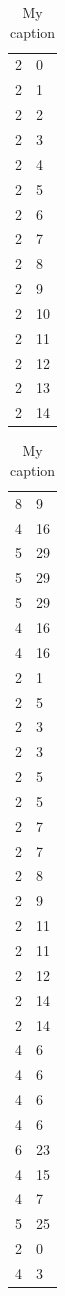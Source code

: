 \documentclass[14pt,letterpaper,hidelinks]{extarticle}
\begin{document}
\begin{table}[]
\centering
\caption{My caption}
\label{my-label}
\begin{tabular}{ll}
2 & 0  \\
2 & 1  \\
2 & 2  \\
2 & 3  \\
2 & 4  \\
2 & 5  \\
2 & 6  \\
2 & 7  \\
2 & 8  \\
2 & 9  \\
2 & 10 \\
2 & 11 \\
2 & 12 \\
2 & 13 \\
2 & 14
\end{tabular}
\end{table}
\begin{table}[]
\centering
\caption{My caption}
\label{my-label}
\begin{tabular}{ll}
8 & 9  \\
4 & 16 \\
5 & 29 \\
5 & 29 \\
5 & 29 \\
4 & 16 \\
4 & 16 \\
2 & 1  \\
2 & 5  \\
2 & 3  \\
2 & 3  \\
2 & 5  \\
2 & 5  \\
2 & 7  \\
2 & 7  \\
2 & 8  \\
2 & 9  \\
2 & 11 \\
2 & 11 \\
2 & 12 \\
2 & 14 \\
2 & 14 \\
4 & 6  \\
4 & 6  \\
4 & 6  \\
4 & 6  \\
6 & 23 \\
4 & 15 \\
4 & 7  \\
5 & 25 \\
2 & 0  \\
4 & 3 
\end{tabular}
\end{table}
\end{document}
